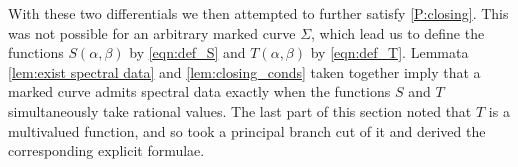 With these two differentials we then attempted to further satisfy \ref{P:closing}. This was not possible for an arbitrary marked curve $Σ$, which lead us to define the functions $S(α,β)$ by \eqref{eqn:def_S} and $T(α,β)$ by \eqref{eqn:def_T}. Lemmata \ref{lem:exist spectral data} and \ref{lem:closing_conds} taken together imply that a marked curve admits spectral data exactly when the functions $S$ and $T$ simultaneously take rational values. The last part of this section noted that $T$ is a multivalued function, and so took a principal branch cut of it and derived the corresponding explicit formulae.

%
%









